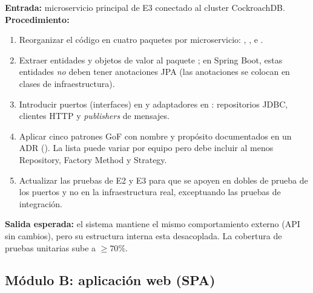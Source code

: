 \documentclass[11pt,a4paper]{article}
\begin{document}
    \textbf{Entrada:} microservicio principal de E3 conectado al cluster CockroachDB.\\
    \textbf{Procedimiento:}
    \begin{enumerate}
        \item Reorganizar el código en cuatro paquetes por microservicio: , ,  e .
        \item Extraer entidades y objetos de valor al paquete ; en Spring Boot, estas entidades \emph{no} deben tener anotaciones JPA (las anotaciones se colocan en clases de infraestructura).
        \item Introducir puertos (interfaces) en  y adaptadores en : repositorios JDBC, clientes HTTP y \textit{publishers} de mensajes.
        \item Aplicar cinco patrones GoF con nombre y propósito documentados en un ADR (). La lista puede variar por equipo pero debe incluir al menos Repository, Factory Method y Strategy.
        \item Actualizar las pruebas de E2 y E3 para que se apoyen en dobles de prueba de los puertos y no en la infraestructura real, exceptuando las pruebas de integración.
    \end{enumerate}
    \textbf{Salida esperada:} el sistema mantiene el mismo comportamiento externo (API sin cambios), pero su estructura interna esta desacoplada. La cobertura de pruebas unitarias sube a $\ge 70\%$.

\subsection{Módulo B: aplicación web (SPA)}
\end{document}
